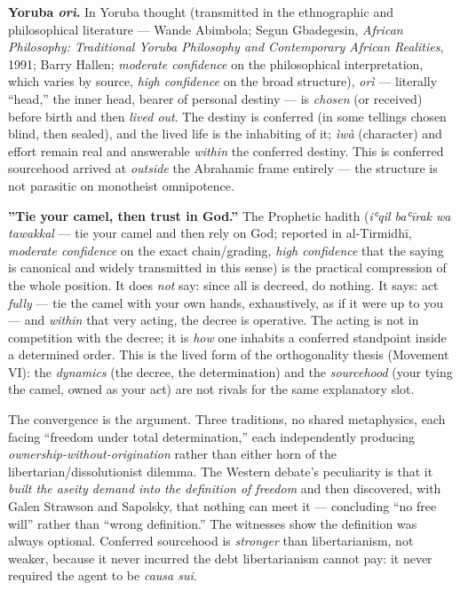 \documentclass[11pt]{article}
\begin{document}
\textbf{Yoruba \emph{orì}.} In Yoruba thought (transmitted in the ethnographic and philosophical literature — Wande Abimbola; Segun Gbadegesin, \emph{African Philosophy: Traditional Yoruba Philosophy and Contemporary African Realities}, 1991; Barry Hallen; \emph{moderate confidence} on the philosophical interpretation, which varies by source, \emph{high confidence} on the broad structure), \emph{orì} — literally ``head,'' the inner head, bearer of personal destiny — is \emph{chosen} (or received) before birth and then \emph{lived out}. The destiny is conferred (in some tellings chosen blind, then sealed), and the lived life is the inhabiting of it; \emph{ìwà} (character) and effort remain real and answerable \emph{within} the conferred destiny. This is conferred sourcehood arrived at \emph{outside} the Abrahamic frame entirely — the structure is not parasitic on monotheist omnipotence.

\textbf{''Tie your camel, then trust in God.''} The Prophetic hadith (\emph{iʿqil baʿīrak wa tawakkal} — tie your camel and then rely on God; reported in al-Tirmidhī, \emph{moderate confidence} on the exact chain/\allowbreak{}grading, \emph{high confidence} that the saying is canonical and widely transmitted in this sense) is the practical compression of the whole position. It does \emph{not} say: since all is decreed, do nothing. It says: act \emph{fully} — tie the camel with your own hands, exhaustively, as if it were up to you — and \emph{within} that very acting, the decree is operative. The acting is not in competition with the decree; it is \emph{how} one inhabits a conferred standpoint inside a determined order. This is the lived form of the orthogonality thesis (Movement VI): the \emph{dynamics} (the decree, the determination) and the \emph{sourcehood} (your tying the camel, owned as your act) are not rivals for the same explanatory slot.

The convergence is the argument. Three traditions, no shared metaphysics, each facing ``freedom under total determination,'' each independently producing \emph{ownership-without-origination} rather than either horn of the libertarian/\allowbreak{}dissolutionist dilemma. The Western debate's peculiarity is that it \emph{built the aseity demand into the definition of freedom} and then discovered, with Galen Strawson and Sapolsky, that nothing can meet it — concluding ``no free will'' rather than ``wrong definition.'' The witnesses show the definition was always optional. Conferred sourcehood is \emph{stronger} than libertarianism, not weaker, because it never incurred the debt libertarianism cannot pay: it never required the agent to be \emph{causa sui}.
\end{document}
